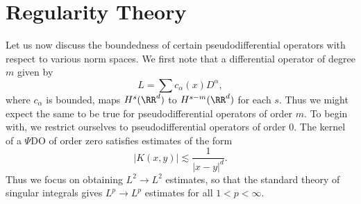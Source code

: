
\section{Regularity Theory}

Let us now discuss the boundedness of certain pseudodifferential operators with respect to various norm spaces. We first note that a differential operator of degree $m$ given by
%
\[ L = \sum c_\alpha(x) D^\alpha, \]
%
where $c_\alpha$ is bounded, maps $H^s(\RR^d)$ to $H^{s-m}(\RR^d)$ for each $s$. Thus we might expect the same to be true for pseudodifferential operators of order $m$. To begin with, we restrict ourselves to pseudodifferential operators of order $0$. The kernel of a $\Psi$DO of order zero satisfies estimates of the form
%
\[ |K(x,y)| \lesssim \frac{1}{|x - y|^d}. \]
%
Thus we focus on obtaining $L^2 \to L^2$ estimates, so that the standard theory of singular integrals gives $L^p \to L^p$ estimates for all $1 < p < \infty$.

